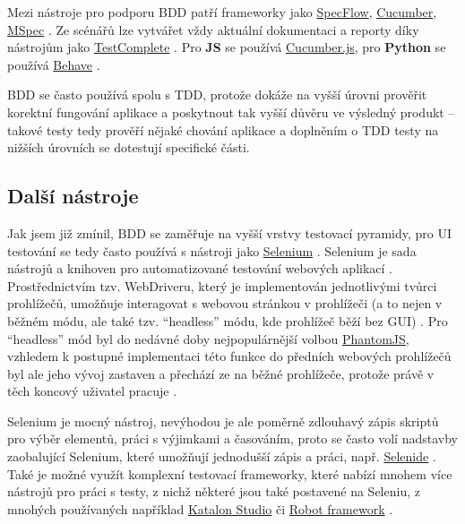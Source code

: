 Mezi nástroje pro podporu BDD patří frameworky jako \href{https://specflow.org/}{SpecFlow}, \href{https://cucumber.io/}{Cucumber}, \href{https://github.com/machine/machine.specifications}{MSpec} \cite{test-swtestinghelp2}. Ze scénářů lze vytvářet vždy aktuální dokumentaci a reporty díky nástrojům jako \href{https://smartbear.com/product/testcomplete/overview/}{TestComplete} \cite{test-smartbear2}. Pro \textbf{JS} se používá \href{https://cucumber.io/docs/installation/javascript/}{Cucumber.js}, pro \textbf{Python} se používá \href{https://behave.readthedocs.io/en/latest/}{Behave} \cite{test-chart-bdd}.

BDD se často používá spolu s TDD, protože dokáže na vyšší úrovni prověřit korektní fungování aplikace a poskytnout tak vyšší důvěru ve výsledný produkt \cite{test-cucumber1} -- takové testy tedy prověří nějaké chování aplikace a doplněním o TDD testy na nižších úrovních se dotestují specifické části.

\subsection{Další nástroje}

Jak jsem již zmínil, BDD se zaměřuje na vyšší vrstvy testovací pyramidy, pro UI testování se tedy často používá s nástroji jako \href{https://www.selenium.dev/}{Selenium} \cite{test-dzone}. Selenium je sada nástrojů a knihoven pro automatizované testování webových aplikací \cite{test-seleniumdocs}. Prostřednictvím tzv. WebDriveru, který je implementován jednotlivými tvůrci prohlížečů, umožňuje interagovat s webovou stránkou v prohlížeči (a to nejen v běžném módu, ale také tzv. \enquote{headless} módu, kde prohlížeč běží bez GUI) \cite{test-hackernoon1, test-seleniumdocs}. Pro \enquote{headless} mód byl do nedávné doby nejpopulárnější volbou \href{https://phantomjs.org/}{PhantomJS}, vzhledem k postupné implementaci této funkce do předních webových prohlížečů byl ale jeho vývoj zastaven a přechází ze na běžné prohlížeče, protože právě v těch koncový uživatel pracuje \cite{test-fowler, test-phantomjs}.

Selenium je mocný nástroj, nevýhodou je ale poměrně zdlouhavý zápis skriptů pro výběr elementů, práci s výjimkami a časováním, proto se často volí nadstavby zaobalující Selenium, které umožňují jednodušší zápis a práci, např. \href{https://selenide.org/}{Selenide} \cite{test-hackernoon1}. Také je možné využít komplexní testovací frameworky, které nabízí mnohem více nástrojů pro práci s testy, z nichž některé jsou také postavené na Seleniu, z mnohých používaných například \href{https://www.katalon.com/}{Katalon Studio} či \href{https://robotframework.org/}{Robot framework} \cite{test-selenium3, test-katalon}.

